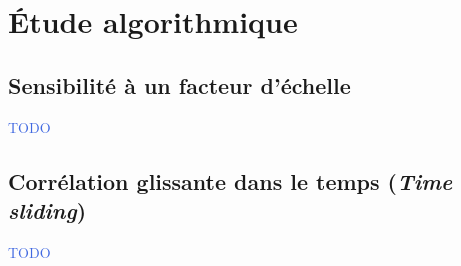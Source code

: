 \documentclass[../main.tex]{subfiles}
\begin{document}
\section{Étude algorithmique}

\subsection{Sensibilité à un facteur d'échelle}


\begin{frame}{\subsecname}
  \begin{center}
    \textcolor{RoyalBlue}{TODO}
  \end{center}
\end{frame}


\subsection{Corrélation glissante dans le temps (\emph{Time sliding})}

\begin{frame}{\subsecname}
  \begin{center}
    \textcolor{RoyalBlue}{TODO}
  \end{center}
\end{frame}
\end{document}
